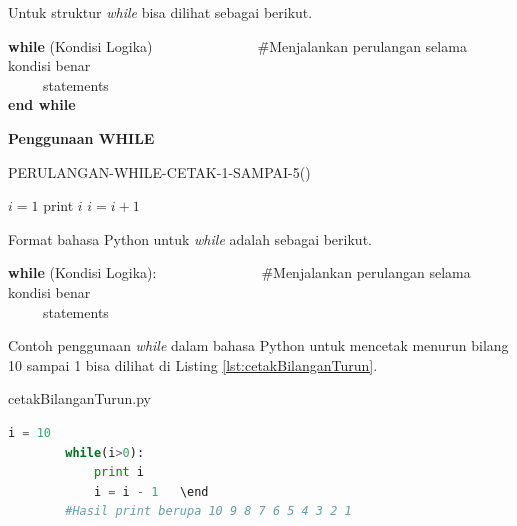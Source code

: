 \FloatBarrier
Untuk struktur \textit{while} bisa dilihat sebagai berikut.
\begin{tabbing}
\textbf{while} (Kondisi Logika)~~~~~~~~~~~~~~~\=\#Menjalankan perulangan selama kondisi benar\\
~~~~~statements\\
\textbf{end while}
\end{tabbing}

\FloatBarrier
\begin{contoh}
	\textbf{Penggunaan WHILE}
		\begin{algorithm}[H]
		\caption{PERULANGAN-WHILE-CETAK-1-SAMPAI-5()}
			\begin{algorithmic}[1]
			\STATE $i=1$
				\STATE print $i$
				\STATE $i=i+1$
			\ENDWHILE
			\end{algorithmic}
		\end{algorithm}
\end{contoh}

Format bahasa Python untuk \textit{while} adalah sebagai berikut.

\begin{tabbing}
\textbf{while} (Kondisi Logika):~~~~~~~~~~~~~~~\=\#Menjalankan perulangan selama kondisi benar\\
~~~~~statements\\
\end{tabbing}

Contoh penggunaan \textit{while} dalam bahasa Python untuk mencetak menurun bilang 10 sampai 1 bisa dilihat di Listing \ref{lst:cetakBilanganTurun}.
\begin{listprog}{cetakBilanganTurun.py}
	\label{lst:cetakBilanganTurun}
	\begin{lstlisting}[language=Python]
		i = 10
		while(i>0):
			print i
			i = i - 1	\end
		#Hasil print berupa 10 9 8 7 6 5 4 3 2 1
	\end{lstlisting}
\end{listprog}


